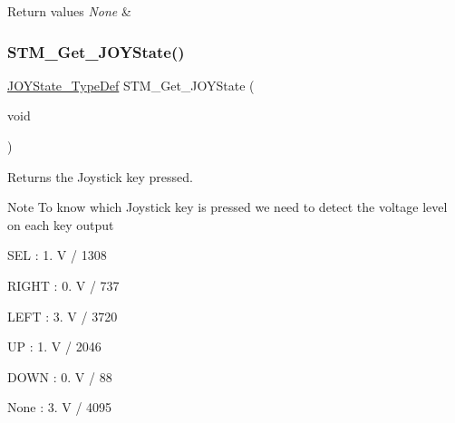 \begin{DoxyRetVals}{Return values}
{\em None} & \\
\hline
\end{DoxyRetVals}
\mbox{\label{group___s_t_m32_f1_x_x___n_u_c_l_e_o___l_o_w___l_e_v_e_l___exported___functions_gab68de4912bc80f43614605cd410a0b4d}} 
\subsubsection{\texorpdfstring{STM\_Get\_JOYState()}{STM\_Get\_JOYState()}}
{\footnotesize\ttfamily \mbox{\hyperlink{group___s_t_m32_f1_x_x___n_u_c_l_e_o___l_o_w___l_e_v_e_l___exported___types_ga7466d9ae142b713772373c9ddfc90332}{J\+O\+Y\+State\+\_\+\+Type\+Def}} S\+T\+M\+\_\+\+Get\+\_\+\+J\+O\+Y\+State (\begin{DoxyParamCaption}\item[{void}]{ }\end{DoxyParamCaption})}



Returns the Joystick key pressed. 

\begin{DoxyNote}{Note}
To know which Joystick key is pressed we need to detect the voltage level on each key output
\begin{DoxyItemize}
\item S\+EL \+: 1. V / 1308
\item R\+I\+G\+HT \+: 0. V / 737
\item L\+E\+FT \+: 3. V / 3720
\item UP \+: 1. V / 2046
\item D\+O\+WN \+: 0. V / 88
\item None \+: 3. V / 4095 
\end{DoxyItemize}
\end{DoxyNote}

